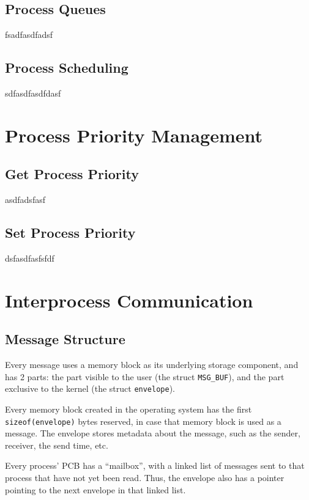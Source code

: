 \documentclass[12pt]{report}
\begin{document}
\subsection{Process Queues}

fsadfasdfadsf

\subsection{Process Scheduling}
sdfasdfasdfdasf


\section{Process Priority Management}

\subsection{Get Process Priority}

asdfadsfasf

\subsection{Set Process Priority}

dsfasdfasfsfdf


\section{Interprocess Communication}

\subsection{Message Structure}

Every message uses a memory block as its underlying storage component, and has 2 parts: the part visible to the user (the struct \texttt{MSG_BUF}), and the part exclusive to the kernel (the struct \texttt{envelope}). 

Every memory block created in the operating system has the first \texttt{sizeof(envelope)} bytes reserved, in case that memory block is used as a message. The envelope stores metadata about the message, such as the sender, receiver, the send time, etc. 

Every process' PCB has a ``mailbox'', with a linked list of messages sent to that process that have not yet been read. Thus, the envelope also has a pointer pointing to the next envelope in that linked list.
\end{document}
